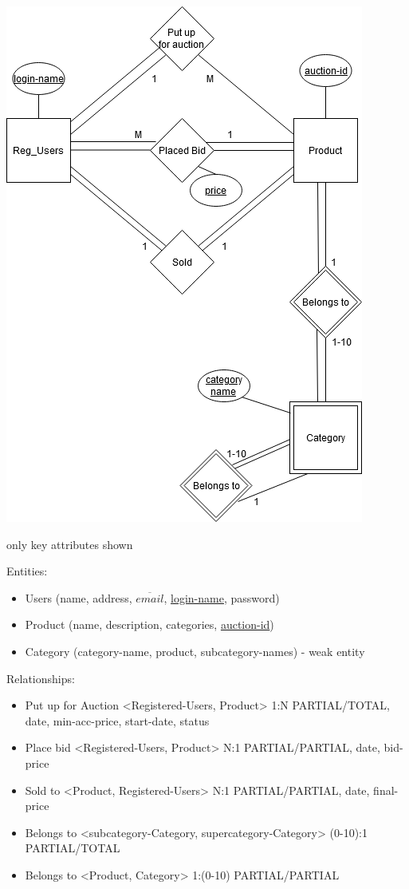 \documentclass[a4paper]{article}
\begin{document}
\begin{center}
    \includegraphics[scale=.45]{hw_8db.png}
    
    \caption{only key attributes shown}
\end{center}

\noindent
Entities:
\begin{itemize}
    \item Users (name, address, $\overline{email}$, \underline{login-name}, password)
    \item Product (name, description, categories, \underline{auction-id})
    \item Category (category-name, product, subcategory-names) - weak entity
\end{itemize}

\noindent
Relationships:
\begin{itemize}
    \item Put up for Auction <Registered-Users, Product> 1:N PARTIAL/TOTAL, date, min-acc-price, start-date, status
    \item Place bid <Registered-Users, Product> N:1 PARTIAL/PARTIAL, date, bid-price
    \item Sold to <Product, Registered-Users> N:1 PARTIAL/PARTIAL, date, final-price
    \item Belongs to <subcategory-Category, supercategory-Category> (0-10):1 PARTIAL/TOTAL
    \item Belongs to <Product, Category> 1:(0-10) PARTIAL/PARTIAL
\end{itemize}
\end{document}
